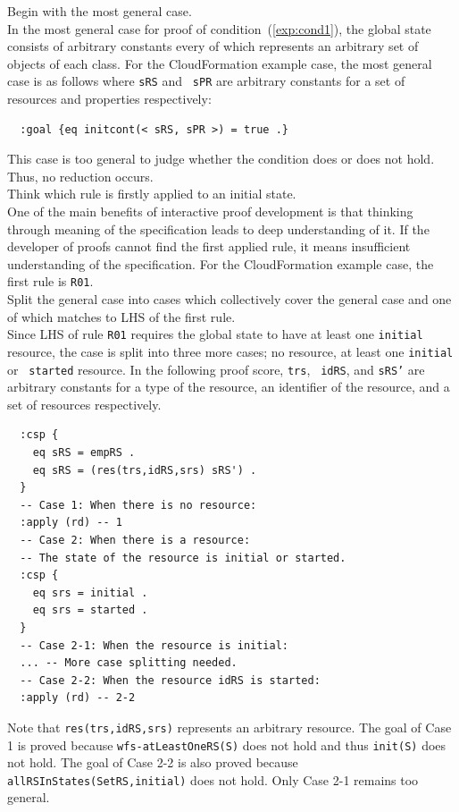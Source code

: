 \documentclass[12pt]{report}
\newcommand{\stt}[1]{{\small{\tt {#1}}}}
\begin{document}
 Begin with the most general case. \\ In the
most general case for proof of condition~(\ref{exp:cond1}), the global
state consists of arbitrary constants every of which represents an
arbitrary set of objects of each class. For the CloudFormation example
case, the most general case is as follows where {\tt sRS} and {\tt
  sPR} are arbitrary constants for a set of resources and properties
respectively:
\begin{verbatim}
  :goal {eq initcont(< sRS, sPR >) = true .}
\end{verbatim}
This case is too general to judge whether the condition does or does
not hold. Thus, no reduction occurs.\\

 Think which rule is firstly applied to an
initial state. \\ One of the main benefits of interactive proof
development is that thinking through meaning of the specification
leads to deep understanding of it. If the developer of proofs cannot
find the first applied rule, it means insufficient understanding of
the specification. For the CloudFormation example case, the first rule
is {\tt R01}. \\

 Split the general case into cases which
collectively cover the general case and one of which matches to LHS of
the first rule. \\ Since LHS of rule {\tt R01} requires the global
state to have at least one {\tt initial} resource, the case is split
into three more cases; no resource, at least one {\tt initial} or {\tt
  started} resource. In the following proof score, {\tt trs}, {\tt
  idRS}, and {\tt sRS'} are arbitrary constants for a type of the
resource, an identifier of the resource, and a set of resources
respectively. 
\begin{verbatim}
  :csp { 
    eq sRS = empRS .
    eq sRS = (res(trs,idRS,srs) sRS') .
  }
  -- Case 1: When there is no resource:
  :apply (rd) -- 1
  -- Case 2: When there is a resource:
  -- The state of the resource is initial or started.
  :csp { 
    eq srs = initial .
    eq srs = started .
  }
  -- Case 2-1: When the resource is initial:
  ... -- More case splitting needed.
  -- Case 2-2: When the resource idRS is started:
  :apply (rd) -- 2-2
\end{verbatim}
Note that \stt{res(trs,idRS,srs)} represents an arbitrary resource.
The goal of Case 1 is proved because \stt{wfs-atLeastOneRS(S)} does
not hold and thus \stt{init(S)} does not hold. The goal of Case 2-2 is
also proved because \stt{allRSInStates(SetRS,initial)} does not hold.
Only Case 2-1 remains too general.\\
\end{document}
